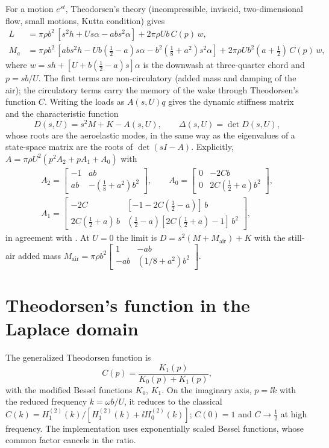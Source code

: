 For a motion $e^{st}$, Theodorsen's theory (incompressible, inviscid,
two-dimensional flow, small motions, Kutta condition) gives
\begin{align}
  L&=\pi\rho b^2\,[s^2h+Us\alpha-abs^2\alpha]+2\pi\rho Ub\,C(p)\,w,\\
  M_a&=\pi\rho b^2\,[abs^2h-Ub(\tfrac12-a)s\alpha-b^2(\tfrac18+a^2)s^2\alpha]
       +2\pi\rho Ub^2(a+\tfrac12)\,C(p)\,w,
\end{align}
where $w=sh+[U+b(\tfrac12-a)s]\alpha$ is the downwash at three-quarter chord
and $p=sb/U$. The first terms are non-circulatory (added mass and damping
of the air); the circulatory terms carry the memory of the wake through
Theodorsen's function $C$. Writing the loads as $A(s,U)q$ gives the dynamic
stiffness matrix and the characteristic function
\begin{equation}
  D(s,U)=s^2M+K-A(s,U),\qquad \Delta(s,U)=\det D(s,U),
  \label{eq:aerodelta}
\end{equation}
whose roots are the aeroelastic modes, in the same way as the eigenvalues of
a state-space matrix are the roots of $\det(sI-A)$. Explicitly,
$A=\pi\rho U^2(p^2A_2+pA_1+A_0)$ with
\begin{gather*}
A_2=\begin{bmatrix}-1&ab\\ab&-(\tfrac18+a^2)b^2\end{bmatrix},\qquad
A_0=\begin{bmatrix}0&-2Cb\\0&2C(\tfrac12+a)b^2\end{bmatrix},\\
A_1=\begin{bmatrix}-2C&[-1-2C(\tfrac12-a)]\,b\\2C(\tfrac12+a)\,b&(\tfrac12-a)[2C(\tfrac12+a)-1]\,b^2\end{bmatrix},
\end{gather*}
in agreement with \citet[Eq.~(33)]{kaiser2022}. At $U=0$ the limit is
$D=s^2(M+M_{\mathrm{air}})+K$ with the still-air added mass
$M_{\mathrm{air}}=\pi\rho b^2\left[\begin{smallmatrix}1&-ab\\-ab&(1/8+a^2)b^2\end{smallmatrix}\right]$.

\section{Theodorsen's function in the Laplace domain}

The generalized Theodorsen function is \citep{edwards1977}
\begin{equation}
  C(p)=\frac{K_1(p)}{K_0(p)+K_1(p)},
\end{equation}
with the modified Bessel functions $K_0$, $K_1$. On the imaginary axis,
$p=\ii k$ with the reduced frequency $k=\omega b/U$, it reduces to the
classical $C(k)=H_1^{(2)}(k)/[H_1^{(2)}(k)+\ii H_0^{(2)}(k)]$; $C(0)=1$ and
$C\to\tfrac12$ at high frequency. The implementation uses exponentially
scaled Bessel functions, whose common factor cancels in the ratio.

